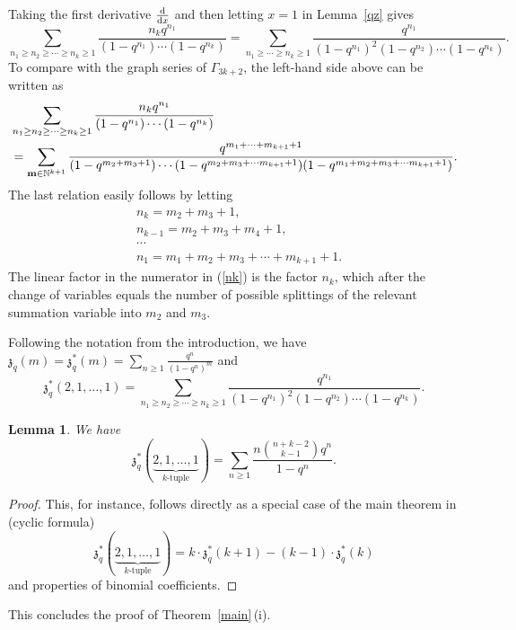 \documentclass[pdftex]{sigma}
\numberwithin{equation}{section}
\newtheorem{Lemma}[Theorem]{Lemma}
\theoremstyle{definition}
\begin{document}
Taking the first derivative $\frac{{\rm d}}{{\rm d}x}$ and then letting $x=1$ in Lemma~\ref{qz} gives
\begin{equation*}
\sum_{n_1 \geq n_2 \geq \cdots \geq n_k \geq 1} \frac{n_k q^{n_1}}{(1-q^{n_1}) \cdots (1-q^{n_k})}=\sum_{n_1 \geq \cdots \geq n_k \geq 1} \frac{q^{n_1}}{(1-q^{n_1})^2(1-q^{n_2})\cdots (1-q^{n_k})}.
\end{equation*}
To compare with the graph series of $\Gamma_{3k+2}$, the left-hand side above can be written as
\begin{align}
& \sum_{n_1 \geq n_2 \geq \cdots \geq n_k \geq 1} \frac{n_k q^{n_1}}{(1-q^{n_1}) \cdots (1-q^{n_k})} \nonumber\\
& = \sum_{{\bf m} \in \mathbb{N}^{k+1}} \frac{q^{m_1+\cdots + m_{k+1}+1}}{(1-q^{m_2+m_3+1}) \cdots (1-q^{m_2+m_3+ \cdots m_{k+1}+1})(1-q^{m_1+m_2+m_3+ \cdots m_{k+1}+1})}.\label{nk}
\end{align}
The last relation easily follows by letting
\begin{align*}
&n_{k} =m_2+m_3+1, \\
& n_{k-1} =m_2+m_3+m_4+1, \\
 & \cdots \\
& n_1=m_1+m_2+m_3+ \cdots +m_{k+1}+1.
\end{align*}
 The linear factor in the numerator in (\ref{nk}) is the factor $n_k$, which after the change of variables equals the number of possible splittings of the relevant summation variable into $m_2$ and $m_3$.

Following the notation from the introduction, we have $\mathfrak{z}_q(m)=\mathfrak{z}^*_q(m)=\sum_{n \geq 1} \frac{q^n}{(1-q^n)^m}$ and
\[
\mathfrak{z}_q^*(2,1,\dots,1)=\sum_{n_1 \geq n_2 \geq \cdots \geq n_k \geq 1} \frac{q^{n_1}}{(1-q^{n_1})^2 (1-q^{n_2}) \cdots (1-q^{n_k})}.
\]
\begin{Lemma}We have
\[
\mathfrak{z}_q^*(\underbrace{2,1,\dots,1}_{\text{$k$-tuple}})=\sum_{n \geq 1} \frac{n {n+k-2 \choose k-1} q^n}{1-q^n}.
\]
\end{Lemma}
\begin{proof}
This, for instance, follows directly as a special case of the main theorem in \cite{Ohno} (cyclic formula)
\[
\mathfrak{z}_q^*(\underbrace{2,1,\dots,1}_{\text{$k$-tuple}})=k \cdot \mathfrak{z}_q^*(k+1)-(k-1) \cdot \mathfrak{z}_q^*(k)
\]
and properties of binomial coefficients.
\end{proof}

This concludes the proof of Theorem~\ref{main}\,(i).
\end{document}
